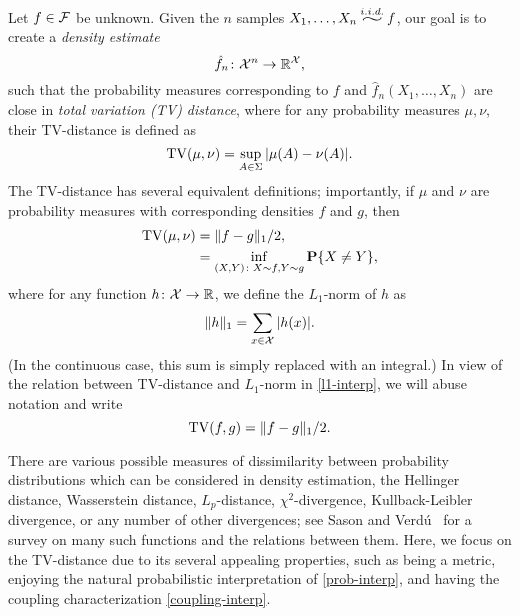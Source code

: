 Let $f \in \mathcal{F}$ be unknown. Given the $n$ samples
$X_1, \dots, X_n \iid f$, our goal is to create a \emph{density
  estimate}
\[
  \hat{f}_n \colon \mathcal{X}^n \to \mathbb{R}^{\mathcal{X}} ,
\]
such that the probability measures corresponding to $f$ and
$\hat{f}_n(X_1, \dots, X_n)$ are close in \emph{total variation (TV)
  distance}, where for any probability measures $\mu, \nu$, their
TV-distance is defined as
\begin{equation}
  \TV(\mu, \nu) = \sup_{A \in \Sigma} |\mu(A) - \nu(A)| . \eqlabel{prob-interp}
\end{equation}
The TV-distance has several equivalent definitions; importantly, if
$\mu$ and $\nu$ are probability measures with corresponding densities
$f$ and $g$, then
\begin{align}
  \TV(\mu, \nu) &= \|f - g\|_1/2 , \eqlabel{l1-interp} \\
                &= \inf_{(X, Y) \colon X \sim f, Y \sim g} \Pr\{X \neq Y\} , \eqlabel{coupling-interp}
\end{align}
where for any function $h \colon \mathcal{X} \to \mathbb{R}$, we define the $L_1$-norm
of $h$ as
\[
  \|h\|_1 = \sum_{x \in \mathcal{X}} |h(x)| .
\]
(In the continuous case, this sum is simply replaced with an
integral.) In view of the relation between TV-distance and $L_1$-norm
in \eqref{l1-interp}, we will abuse notation and write
\[
  \operatorname{TV}(f, g) = \|f - g\|_1/2 .
\]

There are various possible measures of dissimilarity between
probability distributions which can be considered in density
estimation, \eg the Hellinger distance, Wasserstein distance,
$L_p$-distance, $\chi^2$-divergence, Kullback-Leibler divergence, or
any number of other divergences; see Sason and Verd\'{u}~\cite{verdu}
for a survey on many such functions and the relations between
them. Here, we focus on the TV-distance due to its several appealing
properties, such as being a metric, enjoying the natural probabilistic
interpretation of \eqref{prob-interp}, and having the coupling
characterization \eqref{coupling-interp}.

